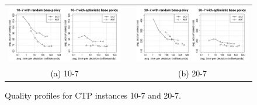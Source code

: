 \documentclass[letterpaper]{article}
\begin{document}
\begin{figure}
\centering
\begin{tabular}{ccc}
  \includegraphics[width=3in,clip=on,trim=.75cm .25cm 1.5cm 1cm]{ctp_tradeoff_10-7.pdf} & \quad\quad\quad &
  \includegraphics[width=3in,clip=on,trim=.75cm .25cm 1.5cm 1cm]{ctp_tradeoff_20-7.pdf} \\
  (a) 10-7 & & (b) 20-7
\end{tabular}
\caption{Quality profiles for CTP instances 10-7 and 20-7.}
\label{fig:ctp:tradeoff:10-7_and_20-7}
\end{figure}
\end{document}
